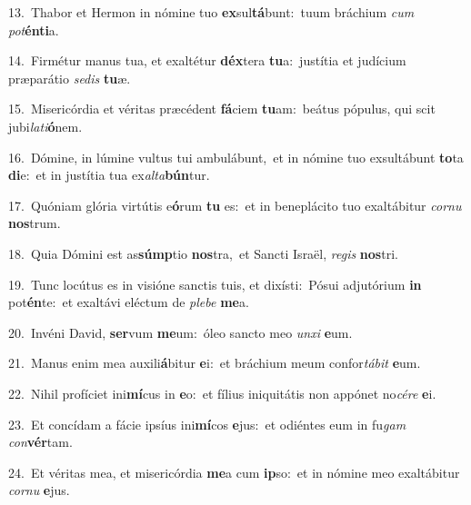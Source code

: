 {\numbfont\textcolor{\numbcolor}{13.}}~Thabor et Hermon in nómine tuo \textbf{ex}\-sul\-\textbf{tá}\-bunt:~\star tuum bráchium \textit{cum} \textit{pot}\-\textbf{én}\textbf{ti}a.\par
{\numbfont\textcolor{\numbcolor}{14.}}~Firmétur manus tua, et exaltétur \textbf{déx}\-tera \textbf{tu}\-a:~\star justítia et judícium præparátio \textit{se}\-\textit{dis} \textbf{tu}\-æ.\par
{\numbfont\textcolor{\numbcolor}{15.}}~Misericórdia et véritas præcédent \textbf{fá}\-ciem \textbf{tu}\-am:~\star beátus pópulus, qui scit jubi\-\textit{la}\-\textit{ti}\textbf{ó}nem.\par
{\numbfont\textcolor{\numbcolor}{16.}}~Dómine, in lúmine vultus tui ambulábunt,~\dagger et in nómine tuo exsultábunt \textbf{to}\-ta \textbf{di}\-e:~\star et in justítia tua ex\-\textit{al}\-\textit{ta}\textbf{bún}tur.\par
{\numbfont\textcolor{\numbcolor}{17.}}~Quóniam glória virtútis e\-\textbf{ó}\-rum \textbf{tu} es:~\star et in beneplácito tuo exaltábitur \textit{cor}\-\textit{nu} \textbf{nos}\-trum.\par
{\numbfont\textcolor{\numbcolor}{18.}}~Quia Dómini est as\-\textbf{súmp}\-tio \textbf{nos}\-tra,~\star et Sancti Israël, \textit{re}\-\textit{gis} \textbf{nos}\-tri.\par
{\numbfont\textcolor{\numbcolor}{19.}}~Tunc locútus es in visióne sanctis tuis, et dixísti:~\dagger Pósui adjutórium \textbf{in} pot\-\textbf{én}\-te:~\star et exaltávi eléctum de \textit{ple}\-\textit{be} \textbf{me}\-a.\par
{\numbfont\textcolor{\numbcolor}{20.}}~Invéni David, \textbf{ser}\-vum \textbf{me}\-um:~\star óleo sancto meo \textit{un}\-\textit{xi} \textbf{e}\-um.\par
{\numbfont\textcolor{\numbcolor}{21.}}~Manus enim mea auxili\-\textbf{á}\-bitur \textbf{e}\-i:~\star et bráchium meum confor\-\textit{tá}\-\textit{bit} \textbf{e}\-um.\par
{\numbfont\textcolor{\numbcolor}{22.}}~Nihil profíciet ini\-\textbf{mí}\-cus in \textbf{e}\-o:~\star et fílius iniquitátis non appónet no\-\textit{cé}\-\textit{re} \textbf{e}\-i.\par
{\numbfont\textcolor{\numbcolor}{23.}}~Et concídam a fácie ipsíus ini\-\textbf{mí}\-cos \textbf{e}\-jus:~\star et odiéntes eum in fu\textit{gam} \textit{con}\-\textbf{vér}tam.\par
{\numbfont\textcolor{\numbcolor}{24.}}~Et véritas mea, et misericórdia \textbf{me}\-a cum \textbf{ip}\-so:~\star et in nómine meo exaltábitur \textit{cor}\-\textit{nu} \textbf{e}\-jus.\par
